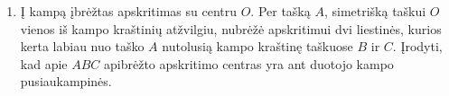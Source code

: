 \begin{enumerate}
\item Į kampą įbrėžtas apskritimas su centru $O$. Per tašką
  $A$, simetrišką taškui $O$ vienos iš kampo kraštinių
  atžvilgiu, nubrėžė apskritimui dvi liestinės, kurios kerta
  labiau nuo taško $A$ nutolusią kampo kraštinę taškuose $B$
  ir $C$. Įrodyti, kad apie $ABC$ apibrėžto apskritimo
  centras yra ant duotojo kampo pusiaukampinės.

\end{enumerate}
